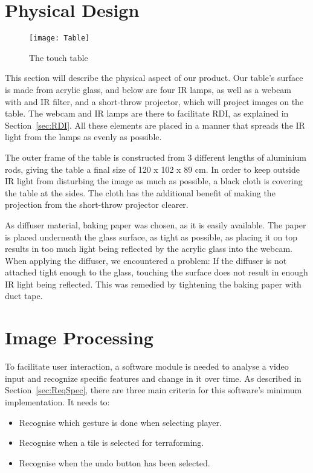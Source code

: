 \section{Physical Design} 
\begin{figure} [!h]
\centering \texttt{[image: Table]}
\label{Fig:Table} \caption{The touch table}
\end{figure}
This section will describe the physical aspect of our product.
Our table's surface is made from acrylic glass, and below are four IR lamps, as well as a webcam with and IR filter, and a short-throw projector, which will project images on the table. The webcam and IR lamps are there to facilitate RDI, as explained in Section~\ref{sec:RDI}. All these elements are placed in a manner that spreads the IR light from the lamps as evenly as possible.

The outer frame of the table is constructed from 3 different lengths of aluminium rods, giving the table a final size of 120 x 102 x 89 cm.
In order to keep outside IR light from disturbing the image as much as possible, a black cloth is covering the table at the sides. The cloth has the additional benefit of making the projection from the short-throw projector clearer. 

As diffuser material, baking paper was chosen, as it is easily available. The paper is placed underneath the glass surface, as tight as possible, as placing it on top results in too much light being reflected by the acrylic glass into the webcam. When applying the diffuser, we encountered a problem: If the diffuser is not attached tight enough to the glass, touching the surface does not result in enough IR light being reflected. This was remedied by tightening the baking paper with duct tape.

\section{Image Processing}
To facilitate user interaction, a software module is needed to analyse a video input and recognize specific features and change in it over time. As described in Section~\ref{sec:ReqSpec}, there are three main criteria for this software's minimum implementation. It needs to:
\begin{itemize}
\item Recognise which gesture is done when selecting player.
\item Recognise when a tile is selected for terraforming.
\item Recognise when the undo button has been selected.
\end{itemize}


